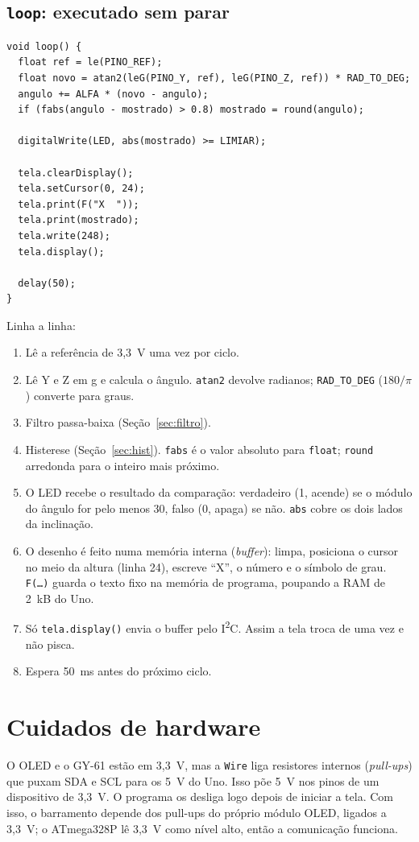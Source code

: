 \documentclass[11pt,a4paper]{article}
\begin{document}
\subsection{\texttt{loop}: executado sem parar}
\begin{lstlisting}
void loop() {
  float ref = le(PINO_REF);
  float novo = atan2(leG(PINO_Y, ref), leG(PINO_Z, ref)) * RAD_TO_DEG;
  angulo += ALFA * (novo - angulo);
  if (fabs(angulo - mostrado) > 0.8) mostrado = round(angulo);

  digitalWrite(LED, abs(mostrado) >= LIMIAR);

  tela.clearDisplay();
  tela.setCursor(0, 24);
  tela.print(F("X  "));
  tela.print(mostrado);
  tela.write(248);
  tela.display();

  delay(50);
}
\end{lstlisting}
Linha a linha:
\begin{enumerate}
  \item Lê a referência de 3,3~V uma vez por ciclo.
  \item Lê Y e Z em g e calcula o ângulo. \texttt{atan2} devolve
    radianos; \texttt{RAD\_TO\_DEG} ($180/\pi$) converte para graus.
  \item Filtro passa-baixa (Seção~\ref{sec:filtro}).
  \item Histerese (Seção~\ref{sec:hist}). \texttt{fabs} é o valor
    absoluto para \texttt{float}; \texttt{round} arredonda para o
    inteiro mais próximo.
  \item O LED recebe o resultado da comparação: verdadeiro (1, acende)
    se o módulo do ângulo for pelo menos 30, falso (0, apaga) se não.
    \texttt{abs} cobre os dois lados da inclinação.
  \item O desenho é feito numa memória interna (\emph{buffer}): limpa,
    posiciona o cursor no meio da altura (linha 24), escreve
    ``X'', o número e o símbolo de grau. \texttt{F(\dots)} guarda o
    texto fixo na memória de programa, poupando a RAM de 2~kB do Uno.
  \item Só \texttt{tela.display()} envia o buffer pelo
    I\textsuperscript{2}C. Assim a tela troca de uma vez e não pisca.
  \item Espera 50~ms antes do próximo ciclo.
\end{enumerate}

\section{Cuidados de hardware}\label{sec:hw}
O OLED e o GY-61 estão em 3,3~V, mas a \texttt{Wire} liga resistores
internos (\emph{pull-ups}) que puxam SDA e SCL para os 5~V do Uno. Isso
põe 5~V nos pinos de um dispositivo de 3,3~V. O programa os desliga
logo depois de iniciar a tela. Com isso, o barramento depende dos
pull-ups do próprio módulo OLED, ligados a 3,3~V; o ATmega328P lê
3,3~V como nível alto, então a comunicação funciona.
\end{document}
